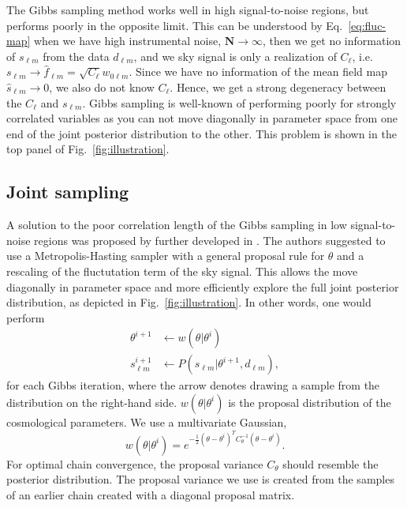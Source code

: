 \documentclass[twocolumn]{../common/aa}
\begin{document}
The Gibbs sampling method works well in high signal-to-noise regions, but performs poorly in the opposite limit. This can be understood by Eq.~\eqref{eq:fluc-map} when we have high instrumental noise, $\mathbf{N} \rightarrow \infty$, then we get no information of $s_{\ell m}$ from the data $d_{\ell m}$, and we sky signal is only a realization of $C_{\ell}$, i.e. $s_{\ell m} \rightarrow \hat{f}_{\ell m} = \sqrt{C_{\ell}} w_{0\ell m}$. Since we have no information of the mean field map $\hat{s}_{\ell m} \rightarrow 0$, we also do not know $C_\ell$. Hence, we get a strong degeneracy between the $C_\ell$ and $s_{\ell m}$. Gibbs sampling is well-known of performing poorly for strongly correlated variables as you can not move diagonally in parameter space from one end of the joint posterior distribution to the other. This problem is shown in the top panel of Fig.~\ref{fig:illustration}.

\subsection{Joint sampling}

A solution to the poor correlation length of the Gibbs sampling in low signal-to-noise regions was proposed by \cite{jewell:2009} further developed in \cite{racine:2016}. The authors suggested to use a Metropolis-Hasting sampler with a general proposal rule for $\theta$ and a rescaling of the fluctutation term of the sky signal. This allows the move diagonally in parameter space and more efficiently explore the full joint posterior distribution, as depicted in Fig.~\ref{fig:illustration}. In other words, one would perform
\begin{align}
    \theta^{i+1} 
 &\leftarrow w(\theta |\theta^i)\\
    s_{\ell m}^{i+1} &\leftarrow P(s_{\ell m} | \theta^{i+1}, d_{\ell m}),
\end{align}
for each Gibbs iteration, where the arrow denotes drawing a sample from the distribution on the right-hand side. $w(\theta |\theta^i)$ is the proposal distribution of the cosmological parameters. We use a multivariate Gaussian,
\begin{equation}
w(\theta |\theta^i) = e^{-\frac12 \left(\theta - \theta^i \right)^T C_{\theta}^{-1}\left(\theta - \theta^i \right)}.
\end{equation}
For optimal chain convergence, the proposal variance $C_{\theta}$ should resemble the posterior distribution. The proposal variance we use is created from the samples of an earlier chain created with a diagonal proposal matrix.
\end{document}
